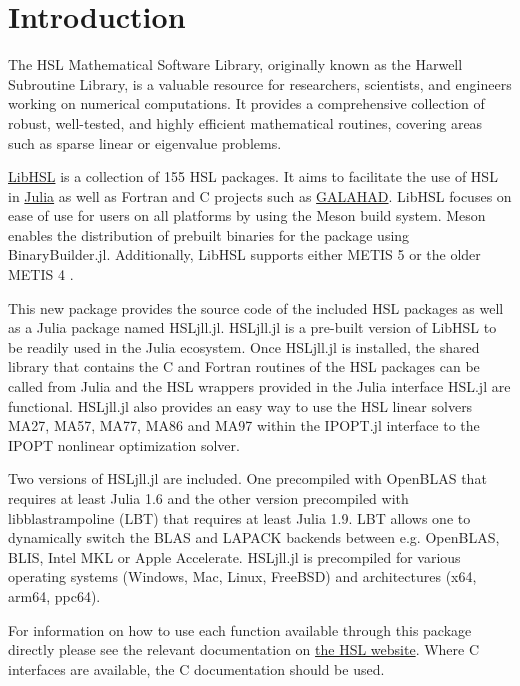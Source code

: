 \documentclass[gdweb]{geradwp}
\renewcommand{\_}{\raisebox{+0.35mm}{\textunderscore}}
\newcommand{\LibHSL}{LibHSL\xspace}
\newcommand{\HSLjll}{HSL\_jll.jl\xspace}
\begin{document}

\GDarticlestart

\section{Introduction}

The HSL Mathematical Software Library, originally known as the Harwell Subroutine Library, is a valuable resource for researchers, scientists, and engineers working on numerical computations.
It provides a comprehensive collection of robust, well-tested, and highly efficient mathematical routines, covering areas such as sparse linear or eigenvalue problems.

\href{https://licences.stfc.ac.uk/product/julia-hsl}{\LibHSL} is a collection of 155 HSL packages.
It aims to facilitate the use of HSL in \href{https://julialang.org/}{Julia} as well as Fortran and C projects such as \href{https://github.com/ralna/GALAHAD}{GALAHAD}.
\LibHSL focuses on ease of use for users on all platforms by using the Meson build system.
Meson enables the distribution of prebuilt binaries for the package using BinaryBuilder.jl.
Additionally, \LibHSL supports either METIS 5 or the older METIS 4 \citep{karypis-kumar-1997}.

This new package provides the source code of the included HSL packages as well as a Julia package named \HSLjll.
\HSLjll is a pre-built version of \LibHSL to be readily used in the Julia ecosystem.
Once \HSLjll is installed, the shared library that contains the C and Fortran routines of the HSL packages can be called from Julia and the HSL wrappers provided in the Julia interface HSL.jl are functional.
\HSLjll also provides an easy way to use the HSL linear solvers MA27, MA57, MA77, MA86 and MA97 within the IPOPT.jl interface to the IPOPT nonlinear optimization solver.

Two versions of \HSLjll are included. One precompiled with OpenBLAS that requires at least Julia 1.6 and the other version precompiled with libblastrampoline (LBT) that requires at least Julia 1.9.
LBT allows one to dynamically switch the BLAS and LAPACK backends between e.g. OpenBLAS, BLIS, Intel MKL or Apple Accelerate.
\HSLjll is precompiled for various operating systems (Windows, Mac, Linux, FreeBSD) and architectures (x64, arm64, ppc64).

For information on how to use each function available through this package directly please see the relevant documentation on \href{https://www.hsl.rl.ac.uk/catalogue/}{the HSL website}.
Where C interfaces are available, the C documentation should be used.
\end{document}
